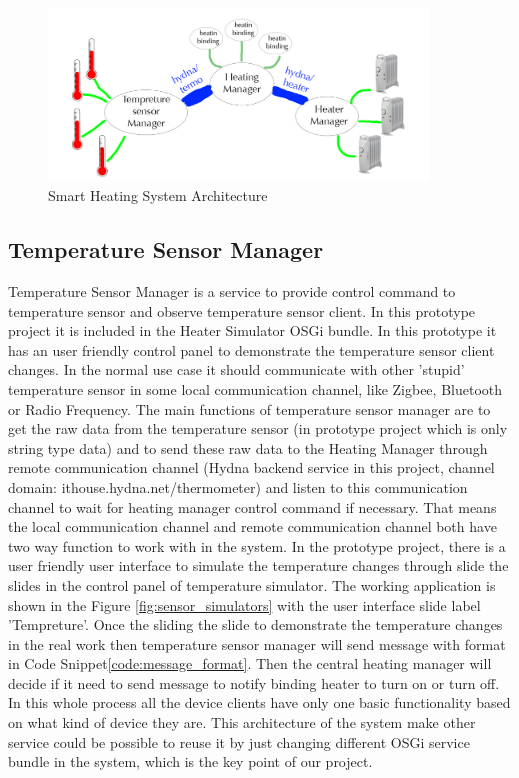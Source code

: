 \begin{figure}
	\centering    	
\includegraphics[width=0.90\textwidth,natwidth=610,natheight=642]{figs/system_architecture.png}
  	\caption{Smart Heating System Architecture}
  	\label{fig:system_architecture}
\end{figure}

\subsection{Temperature Sensor Manager}
\par Temperature Sensor Manager is a service to provide control command to temperature sensor and observe temperature sensor client. In this prototype project it is included in the Heater Simulator OSGi bundle.  In this prototype it has an user friendly control panel to demonstrate the temperature sensor client changes. In the normal use case it should communicate with other 'stupid' temperature sensor in some local communication channel, like Zigbee, Bluetooth or Radio Frequency. The main functions of temperature sensor manager are to get the raw data from the temperature sensor (in prototype project which is only string type data) and to send these raw data to the Heating Manager through remote communication channel (Hydna backend service in this project, channel domain: ithouse.hydna.net/thermometer) and listen to this communication channel to wait for heating manager control command if necessary. That means the local communication channel and remote communication channel both have two way function to work with in the system. In the prototype project, there is a user friendly user interface to simulate the temperature changes through slide the slides in the control panel of temperature simulator. The working application is shown in the Figure \ref{fig:sensor_simulators} with the user interface slide label 'Tempreture'. Once the sliding the slide to demonstrate the temperature changes in the real work then temperature sensor manager will send message with format in Code Snippet\ref{code:message_format}. Then the central heating manager will decide if it need to send message to notify binding heater to turn on or turn off. In this whole process all the device clients have only one basic functionality based on what kind of device they are. This architecture of the system make other service could be possible to reuse it by just changing different OSGi service bundle in the system, which is the key point of our project.

